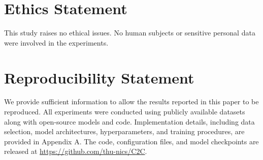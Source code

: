 \section*{Ethics Statement}
This study raises no ethical issues. No human subjects or sensitive personal data were involved in the experiments.

\section*{Reproducibility Statement}
We provide sufficient information to allow the results reported in this paper to be reproduced.
All experiments were conducted using publicly available datasets along with open-source models and code. Implementation details, including data selection, model architectures, hyperparameters, and training procedures, are provided in Appendix A. The code, configuration files, and model checkpoints are released at \url{https://github.com/thu-nics/C2C}.